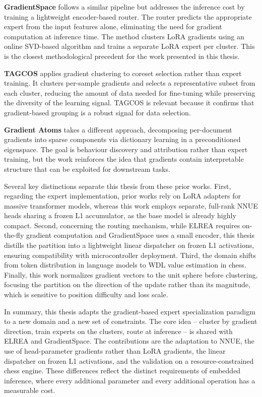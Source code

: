 \textbf{GradientSpace} \parencite{sridharan2025} follows a similar pipeline but addresses the inference cost by training a lightweight encoder-based router. The router predicts the appropriate expert from the input features alone, eliminating the need for gradient computation at inference time. The method clusters LoRA gradients using an online SVD-based algorithm and trains a separate LoRA expert per cluster. This is the closest methodological precedent for the work presented in this thesis.

\textbf{TAGCOS} \parencite{zhang2024} applies gradient clustering to coreset selection rather than expert training. It clusters per-sample gradients and selects a representative subset from each cluster, reducing the amount of data needed for fine-tuning while preserving the diversity of the learning signal. TAGCOS is relevant because it confirms that gradient-based grouping is a robust signal for data selection.

\textbf{Gradient Atoms} \parencite{rosser2026} takes a different approach, decomposing per-document gradients into sparse components via dictionary learning in a preconditioned eigenspace. The goal is behaviour discovery and attribution rather than expert training, but the work reinforces the idea that gradients contain interpretable structure that can be exploited for downstream tasks.

Several key distinctions separate this thesis from these prior works. First, regarding the expert implementation, prior works rely on LoRA adapters for massive transformer models, whereas this work employs separate, full-rank NNUE heads sharing a frozen L1 accumulator, as the base model is already highly compact. Second, concerning the routing mechanism, while ELREA requires on-the-fly gradient computation and GradientSpace uses a small encoder, this thesis distills the partition into a lightweight linear dispatcher on frozen L1 activations, ensuring compatibility with microcontroller deployment. Third, the domain shifts from token distribution in language models to WDL value estimation in chess. Finally, this work normalizes gradient vectors to the unit sphere before clustering, focusing the partition on the direction of the update rather than its magnitude, which is sensitive to position difficulty and loss scale.

In summary, this thesis adapts the gradient-based expert specialization paradigm to a new domain and a new set of constraints. The core idea -- cluster by gradient direction, train experts on the clusters, route at inference -- is shared with ELREA and GradientSpace. The contributions are the adaptation to NNUE, the use of head-parameter gradients rather than LoRA gradients, the linear dispatcher on frozen L1 activations, and the validation on a resource-constrained chess engine. These differences reflect the distinct requirements of embedded inference, where every additional parameter and every additional operation has a measurable cost.